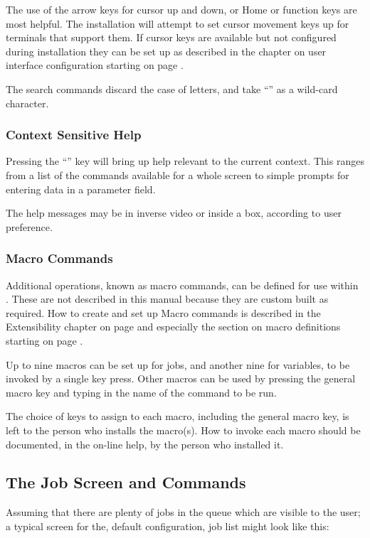 The use of the arrow keys for cursor up and down, or Home or function keys are most helpful. The \ProductName{} installation will attempt to set
cursor movement keys up for terminals that support them. If cursor keys are available but not configured during installation they can be set up
as described in the chapter on user interface configuration starting on page \pageref{bkm:Configurability}.

The search commands discard the case of letters, and take ``'' as a wild-card character.

\subsubsection{Context Sensitive Help}
Pressing the ``'' key will bring up help relevant to the current context. This ranges from a
list of the commands available for a whole screen to simple prompts for entering data in a parameter field.

The help messages may be in inverse video or inside a box, according to user preference.

\subsubsection{Macro Commands}
Additional operations, known as macro commands, can be defined for use within \PrBtq{}. These are not described in this
manual because they are custom built as required. How to create and set
up Macro commands is described in the Extensibility chapter on page \pageref{bkm:Extensibility} and
especially the section on macro definitions starting on page \pageref{bkm:Macrodefs}.

Up to nine macros can be set up for jobs, and another nine for
variables, to be invoked by a single key press. Other macros can be
used by pressing the general macro key and typing in the name of the
command to be run.

The choice of keys to assign to each macro, including the general macro
key, is left to the person who installs the macro(s). How to invoke
each macro should be documented, in the on-line help, by the person who
installed it.

\subsection{The Job Screen and Commands}
Assuming that there are plenty of jobs in the queue which are visible to
the user; a typical screen for the, default configuration, job list
might look like this:

